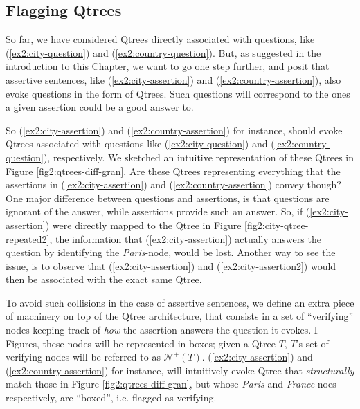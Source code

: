 \subsection{Flagging Qtrees}

So far, we have considered Qtrees directly associated with questions, like (\ref{ex2:city-question}) and (\ref{ex2:country-question}). But, as suggested in the introduction to this Chapter, we want to go one step further, and posit that assertive sentences, like (\ref{ex2:city-assertion}) and (\ref{ex2:country-assertion}), also evoke questions in the form of Qtrees. Such questions will correspond to the ones a given assertion could be a good answer to.

\begin{exe}
	\ex \label{ex2:city-country-assertions}
	\begin{xlist}
		\label{ex2:city-assertion}
		\label{ex2:country-assertion}
	\end{xlist}
\end{exe}

So (\ref{ex2:city-assertion}) and (\ref{ex2:country-assertion}) for instance, should evoke Qtrees associated with questions like (\ref{ex2:city-question}) and (\ref{ex2:country-question}), respectively. We sketched an intuitive representation of these Qtrees in Figure \ref{fig2:qtrees-diff-gran}. Are these Qtrees representing everything that the assertions in (\ref{ex2:city-assertion}) and (\ref{ex2:country-assertion}) convey though? One major difference between questions and assertions, is that questions are ignorant of the answer, while assertions provide such an answer. So, if (\ref{ex2:city-assertion}) were directly mapped to the Qtree in Figure \ref{fig2:city-qtree-repeated2}, the information that (\ref{ex2:city-assertion}) actually answers the question by identifying the \textit{Paris}-node, would be lost. Another way to see the issue, is to observe that (\ref{ex2:city-assertion}) and (\ref{ex2:city-assertion2}) would then be associated with the exact same Qtree.

\begin{exe}
	\label{ex2:city-assertion2}
\end{exe}

To avoid such collisions in the case of assertive sentences, we define an extra piece of machinery on top of the Qtree architecture, that consists in a set of ``verifying'' nodes keeping track of \textit{how} the assertion answers the question it evokes. I Figures, these nodes will be represented in boxes; given a Qtree $T$, $T$'s set of verifying nodes will be referred to as $\mathcal{N}^+(T)$. (\ref{ex2:city-assertion}) and (\ref{ex2:country-assertion}) for instance, will intuitively evoke Qtree that \textit{structurally} match those in Figure \ref{fig2:qtrees-diff-gran}, but whose \textit{Paris} and \textit{France} noes respectively, are ``boxed'', i.e. flagged as verifying.

